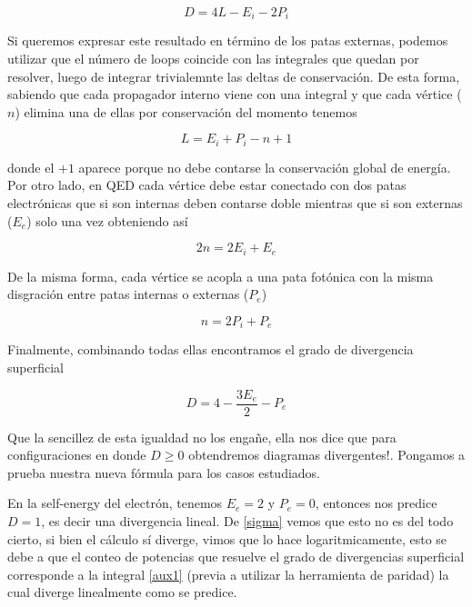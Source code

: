 \documentclass[tickz]{article}
\numberwithin{equation}{section}
\begin{document}
\begin{equation}\label{key}
D=4L-E_i-2P_i
\end{equation}

Si queremos expresar este resultado en término de los patas externas, podemos utilizar que el número de loops coincide con las integrales que quedan por resolver, luego de integrar trivialemnte las deltas de conservación. De esta forma, sabiendo que cada propagador interno viene con una integral y que cada vértice ($ n $) elimina una de ellas por conservación del momento tenemos 

\begin{equation}\label{key}
L=E_i+P_i-n+1
\end{equation}

donde el $ +1 $ aparece porque no debe contarse la conservación global de energía. Por otro lado, en QED cada vértice debe estar conectado con dos patas electrónicas que si son internas deben contarse doble mientras que si son externas ($ E_e $) solo una vez obteniendo así

\begin{equation}\label{key}
2n=2E_i + E_e
\end{equation}

De la misma forma, cada vértice se acopla a una pata fotónica con la misma disgración entre patas internas o externas ($ P_e $)

\begin{equation}\label{key}
n=2P_i + P_e
\end{equation}

Finalmente, combinando todas ellas encontramos el grado de divergencia superficial

\begin{equation}\label{D}
D=4-\frac{3E_e}{2}-P_e
\end{equation}

Que la sencillez de esta igualdad no los engañe, ella nos dice que para configuraciones en donde $ D\geq0 $ obtendremos diagramas divergentes!. Pongamos a prueba nuestra nueva fórmula para los casos estudiados. 

En la self-energy del electrón, tenemos $ E_e=2 $ y $ P_e=0 $, entonces nos predice $ D=1 $, es decir una divergencia lineal. De \ref{sigma} vemos que esto no es del todo cierto, si bien el cálculo sí diverge, vimos que lo hace logaritmicamente, esto se debe a que el conteo de potencias que resuelve el grado de divergencias superficial corresponde a la integral \ref{aux1} (previa a utilizar la herramienta de paridad) la cual diverge linealmente como se predice. 
\end{document}
